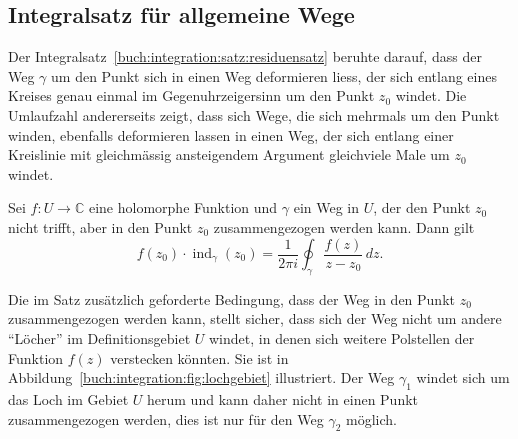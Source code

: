 %
%
%
\subsection{Integralsatz für allgemeine Wege}
Der Integralsatz~\ref{buch:integration:satz:residuensatz} beruhte darauf,
dass der Weg $\gamma$ um den Punkt sich in einen Weg deformieren liess,
der sich entlang eines Kreises genau einmal im Gegenuhrzeigersinn um den
Punkt $z_0$ windet.
Die Umlaufzahl andererseits zeigt, dass sich Wege, die sich mehrmals
um den Punkt winden, ebenfalls deformieren lassen in einen Weg, der sich
entlang einer Kreislinie mit gleichmässig ansteigendem Argument gleichviele
Male um $z_0$ windet.

\begin{satz}
\label{buch:integration:satz:residuensatzn}
%
%
Sei $f\colon U \to \mathbb{C}$ eine holomorphe Funktion und $\gamma$
ein Weg in $U$, der den Punkt $z_0$ nicht trifft, aber in den Punkt $z_0$
zusammengezogen werden kann.
Dann gilt
\[
f(z_0)
\cdot
\operatorname{ind}_{\gamma}(z_0)
=
\frac{1}{2\pi i}
\oint_\gamma \frac{f(z)}{z-z_0}\,dz.
\]
\end{satz}

Die im Satz zusätzlich geforderte Bedingung, dass der Weg in den Punkt 
$z_0$ zusammengezogen werden kann, stellt sicher, dass sich der Weg nicht
um andere ``Löcher'' im Definitionsgebiet $U$ windet, in denen sich weitere
Polstellen der Funktion $f(z)$ verstecken könnten.
%
Sie ist in Abbildung~\ref{buch:integration:fig:lochgebiet} illustriert.
Der Weg $\gamma_1$ windet sich um das Loch im Gebiet $U$ herum und kann
daher nicht in einen Punkt zusammengezogen werden, dies ist nur für den
Weg $\gamma_2$ möglich.
